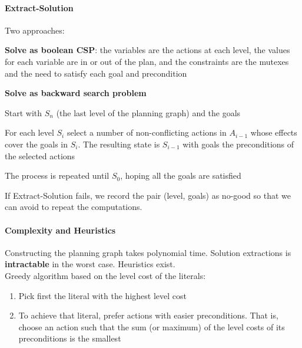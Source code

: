 \documentclass[10pt]{report}
\begin{document}
\paragraph{Extract-Solution} Two approaches:
\begin{list}{}{}
	\item \textbf{Solve as boolean CSP}: the variables are the actions at each level, the values for each variable are in or out of the plan, and the constraints are the mutexes and the need to satisfy each goal and precondition
	\item \textbf{Solve as backward search problem}\begin{list}{}{}
		\item Start with $S_n$ (the last level of the planning graph) and the goals
		\item For each level $S_i$ select a number of non-conflicting actions in $A_{i-1}$ whose effects cover the goals in $S_i$. The resulting state is $S_{i-1}$ with goals the preconditions of the selected actions
		\item The process is repeated until $S_0$, hoping all the goals are satisfied
	\end{list}
\end{list}
If Extract-Solution fails, we record the pair (level, goals) as no-good so that we can avoid to repeat the computations.
\paragraph{Complexity and Heuristics} Constructing the planning graph takes polynomial time. Solution extractions is \textbf{intractable} in the worst case. Heuristics exist.\\
Greedy algorithm based on the level cost of the literals:
\begin{enumerate}
	\item Pick first the literal with the highest level cost
	\item To achieve that literal, prefer actions with easier preconditions. That is, choose an action such that the sum (or maximum) of the level costs of its preconditions is the smallest
\end{enumerate}
\end{document}
